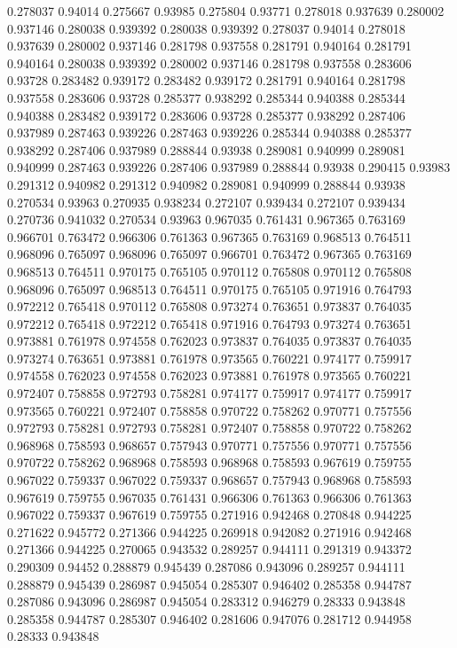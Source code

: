 0.278037 0.94014
0.275667 0.93985
0.275804 0.93771
0.278018 0.937639
0.280002 0.937146
0.280038 0.939392
0.280038 0.939392
0.278037 0.94014
0.278018 0.937639
0.280002 0.937146
0.281798 0.937558
0.281791 0.940164
0.281791 0.940164
0.280038 0.939392
0.280002 0.937146
0.281798 0.937558
0.283606 0.93728
0.283482 0.939172
0.283482 0.939172
0.281791 0.940164
0.281798 0.937558
0.283606 0.93728
0.285377 0.938292
0.285344 0.940388
0.285344 0.940388
0.283482 0.939172
0.283606 0.93728
0.285377 0.938292
0.287406 0.937989
0.287463 0.939226
0.287463 0.939226
0.285344 0.940388
0.285377 0.938292
0.287406 0.937989
0.288844 0.93938
0.289081 0.940999
0.289081 0.940999
0.287463 0.939226
0.287406 0.937989
0.288844 0.93938
0.290415 0.93983
0.291312 0.940982
0.291312 0.940982
0.289081 0.940999
0.288844 0.93938
0.270534 0.93963
0.270935 0.938234
0.272107 0.939434
0.272107 0.939434
0.270736 0.941032
0.270534 0.93963
0.967035 0.761431
0.967365 0.763169
0.966701 0.763472
0.966306 0.761363
0.967365 0.763169
0.968513 0.764511
0.968096 0.765097
0.968096 0.765097
0.966701 0.763472
0.967365 0.763169
0.968513 0.764511
0.970175 0.765105
0.970112 0.765808
0.970112 0.765808
0.968096 0.765097
0.968513 0.764511
0.970175 0.765105
0.971916 0.764793
0.972212 0.765418
0.970112 0.765808
0.973274 0.763651
0.973837 0.764035
0.972212 0.765418
0.972212 0.765418
0.971916 0.764793
0.973274 0.763651
0.973881 0.761978
0.974558 0.762023
0.973837 0.764035
0.973837 0.764035
0.973274 0.763651
0.973881 0.761978
0.973565 0.760221
0.974177 0.759917
0.974558 0.762023
0.974558 0.762023
0.973881 0.761978
0.973565 0.760221
0.972407 0.758858
0.972793 0.758281
0.974177 0.759917
0.974177 0.759917
0.973565 0.760221
0.972407 0.758858
0.970722 0.758262
0.970771 0.757556
0.972793 0.758281
0.972793 0.758281
0.972407 0.758858
0.970722 0.758262
0.968968 0.758593
0.968657 0.757943
0.970771 0.757556
0.970771 0.757556
0.970722 0.758262
0.968968 0.758593
0.968968 0.758593
0.967619 0.759755
0.967022 0.759337
0.967022 0.759337
0.968657 0.757943
0.968968 0.758593
0.967619 0.759755
0.967035 0.761431
0.966306 0.761363
0.966306 0.761363
0.967022 0.759337
0.967619 0.759755
0.271916 0.942468
0.270848 0.944225
0.271622 0.945772
0.271366 0.944225
0.269918 0.942082
0.271916 0.942468
0.271366 0.944225
0.270065 0.943532
0.289257 0.944111
0.291319 0.943372
0.290309 0.94452
0.288879 0.945439
0.287086 0.943096
0.289257 0.944111
0.288879 0.945439
0.286987 0.945054
0.285307 0.946402
0.285358 0.944787
0.287086 0.943096
0.286987 0.945054
0.283312 0.946279
0.28333 0.943848
0.285358 0.944787
0.285307 0.946402
0.281606 0.947076
0.281712 0.944958
0.28333 0.943848
